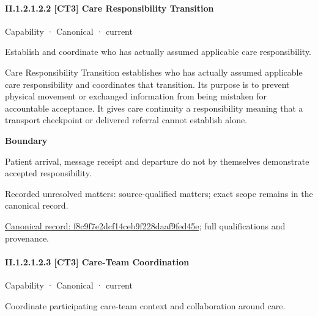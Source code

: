 \paragraph*{II.1.2.1.2.2 [CT3] Care Responsibility Transition}
\label{navigation:II.1.2.1.2.2}

\label{element:f8c9f7e2dcf14ceb9f228daaf9fed45e}
{\small Capability · Canonical · current}\par

Establish and coordinate who has actually assumed applicable care responsibility.



Care Responsibility Transition establishes who has actually assumed applicable care responsibility and coordinates that transition. Its purpose is to prevent physical movement or exchanged information from being mistaken for accountable acceptance. It gives care continuity a responsibility meaning that a transport checkpoint or delivered referral cannot establish alone.



\textbf{Boundary}



Patient arrival, message receipt and departure do not by themselves demonstrate accepted responsibility.


{\small Recorded unresolved matters: source-qualified matters; exact scope remains in the canonical record.}\par
{\footnotesize \href{../../../../continuum/strategy/capability/f8c9f7e2dcf14ceb9f228daaf9fed45e.md}{Canonical record: f8c9f7e2dcf14ceb9f228daaf9fed45e}; full qualifications and provenance.}\par
\paragraph*{II.1.2.1.2.3 [CT3] Care-Team Coordination}
\label{navigation:II.1.2.1.2.3}

\label{element:bbd138aab70d4b06b43662fb3f5373db}
{\small Capability · Canonical · current}\par

Coordinate participating care-team context and collaboration around care.



